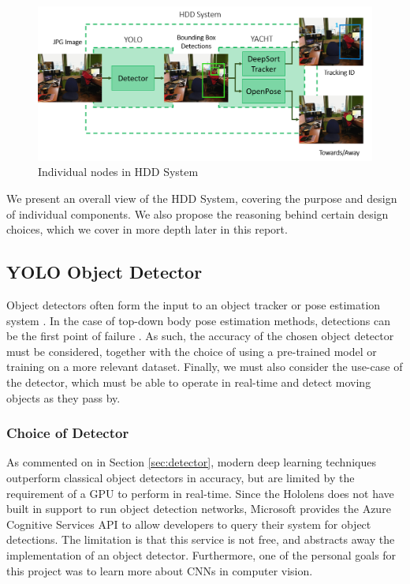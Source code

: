 \begin{figure}[ht]
	\centering
	\includegraphics[width=1.0\linewidth]{img/chapter4_analysis/hddSystemDiagram.png}
	\caption{Individual nodes in HDD System}
	\label{fig:detailedHDD}
\end{figure}

We present an overall view of the HDD System, covering the purpose and design of individual components. We also propose the reasoning behind certain design choices, which we cover in more depth later in this report.

\subsection{YOLO Object Detector}
Object detectors often form the input to an object tracker or pose estimation system \cite{Bewley2016, Jin2017}. In the case of top-down body pose estimation methods, detections can be the first point of failure \cite{Insafutdinov}. As such, the accuracy of the chosen object detector must be considered, together with the choice of using a pre-trained model or training on a more relevant dataset. Finally, we must also consider the use-case of the detector, which must be able to operate in real-time and detect moving objects as they pass by.

\subsubsection{Choice of Detector}
As commented on in Section \ref{sec:detector}, modern deep learning techniques outperform classical object detectors in accuracy, but are limited by the requirement of a GPU to perform in real-time. Since the Hololens does not have built in support to run object detection networks, Microsoft provides the Azure Cognitive Services API to allow developers to query their system for object detections. The limitation is that this service is not free, and abstracts away the implementation of an object detector. Furthermore, one of the personal goals for this project was to learn more about CNNs in computer vision.

